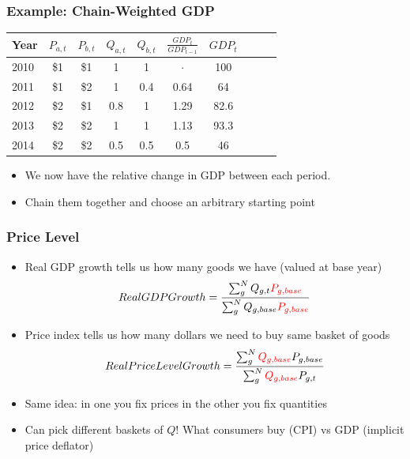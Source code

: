 \documentclass{beamer}
\begin{document}
  
    \begin{frame}
\frametitle[alignment=center]{Example: Chain-Weighted GDP}
\small
\begin{table}
\centering
\begin{tabular}{lccccccccc}
Year & $P_{a,t}$ & $P_{b,t}$ & $Q_{a,t}$ & $Q_{b,t}$ & $\frac{GDP_t}{GDP_{t-1}}$ & $GDP_t$\\
\hline
2010 & \$1 & \$1 & 1 & 1 & $\cdot$ & 100\\
2011 & \$1 & \$2 & 1 & 0.4 & 0.64 & 64\\
2012 & \$2 & \$1 & 0.8 & 1  & 1.29 & 82.6\\
2013 & \$2 & \$2 & 1 & 1  & 1.13 & 93.3\\
2014 & \$2 & \$2 & 0.5 & 0.5 & 0.5 & 46\\
\end{tabular}
\end{table}
\begin{itemize}
\item We now have the relative change in GDP between each period.
\item Chain them together and choose an arbitrary starting point 
\end{itemize}
\end{frame}

    \begin{frame}
\frametitle[alignment=center]{Price Level}
\begin{itemize}
\item Real GDP growth tells us how many goods we have (valued at base year)
$$Real GDP Growth=\frac{\sum_{g}^NQ_{g,t}\textcolor{red}{P_{g,base}}}{\sum_{g}^NQ_{g,base}\textcolor{red}{P_{g,base}}}$$
\item Price index tells us how many dollars we need to buy same basket of goods
$$Real Price Level Growth=\frac{\sum_{g}^N\textcolor{red}{Q_{g,base}}P_{g,base}}{\sum_{g}^N\textcolor{red}{Q_{g,base}}P_{g,t}}$$
\item Same idea:  in one you fix prices in the other you fix quantities 
\item Can pick different baskets of $Q$!  What consumers buy (CPI) vs GDP (implicit price deflator)
\end{itemize}
\end{frame}
\end{document}
